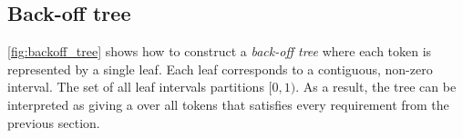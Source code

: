 \documentclass[draft]{IIBproject}
\makeatletter
\DeclareRobustCommand*{\AbbreviationWithDot}[1]{\@ifnextchar{.}{#1}{#1.\@\xspace}}
\DeclareRobustCommand*{\pmf}{\AbbreviationWithDot{p.m.f}}
\makeatother
\begin{document}
\subsection{Back-off tree}

\cref{fig:backoff_tree} shows how to construct a \emph{back-off tree} where each token is represented by a single leaf. Each leaf corresponds to a contiguous, non-zero interval. The set of all leaf intervals partitions $[0,1)$. As a result, the tree can be interpreted as giving a \pmf over all tokens that satisfies every requirement from the previous section.

\newlength{\vertexSize}
\setlength{\vertexSize}{10 pt}


%
\newcommand{\rootVertex}[2] {
	\node [vertex,fill=black!0] at (#1,#2) {};
}

%
\newcommand{\backoff}[6] {
	\draw [shorten >= 0.5*(\vertexSize+\pgflinewidth), shorten <= 0.5*(\vertexSize+\pgflinewidth), ->] (#1,#2) to [bend #5=12.5] (#3,#4);
	\node [vertex,fill=black!10] at (#3,#4) {\tiny #6};
}

%
\newcommand{\leaf}[6] {
	\draw [shorten >= 0.5*(\vertexSize+\pgflinewidth), shorten <= 0.5*(\vertexSize+\pgflinewidth), ->] (#1,#2) to [bend #5=12.5] (#3,#4);
	\node [vertex,fill=black!0] at (#3,#4) {\tiny #6};
}
\end{document}

